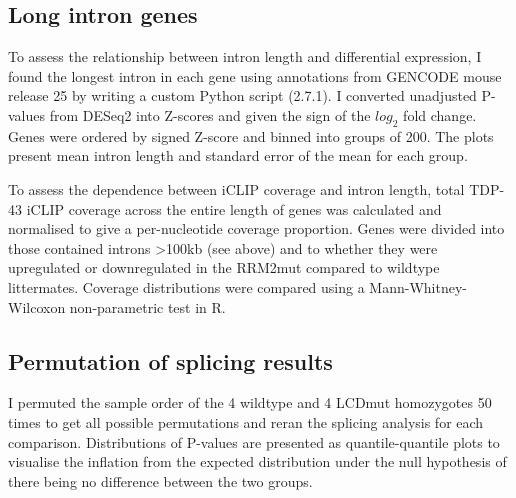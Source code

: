 \subsection{Long intron genes}
To assess the relationship between intron length and differential expression, I found the longest intron in each gene using annotations from GENCODE mouse release 25 \citep{Harrow2012} by writing a custom Python script (2.7.1). I converted unadjusted P-values from DESeq2 into Z-scores and given the sign of the $log_2$ fold change. Genes were ordered by signed Z-score and binned into groups of  200. The plots present mean intron length and  standard error of the mean for each group.  

To assess  the  dependence between  iCLIP  coverage and  intron  length,  total TDP-43  iCLIP  coverage 
across  the entire length of genes was calculated and normalised  to give a per-nucleotide coverage proportion. Genes were divided into those contained introns >100kb (see above) and to whether they were  upregulated  or  downregulated in  the RRM2mut compared  to wildtype littermates.  Coverage distributions were compared using a Mann-Whitney-Wilcoxon non-parametric test in R.

\subsection{Permutation of splicing results}
I permuted the sample order of the 4 wildtype and 4 LCDmut homozygotes 50 times to get all possible permutations and reran the splicing analysis for each comparison. Distributions of P-values are presented as quantile-quantile plots to visualise the inflation from the expected distribution under the null hypothesis of there being no difference between the two groups. 


